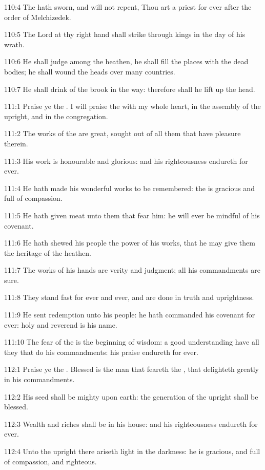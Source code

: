 110:4 The \LORD hath sworn, and will not repent, Thou art a priest for ever after the order of Melchizedek.

110:5 The Lord at thy right hand shall strike through kings in the day of his wrath.

110:6 He shall judge among the heathen, he shall fill the places with the dead bodies; he shall wound the heads over many countries.

110:7 He shall drink of the brook in the way: therefore shall he lift up the head.



111:1 Praise ye the \LORD. I will praise the \LORD with my whole heart, in the assembly of the upright, and in the congregation.

111:2 The works of the \LORD are great, sought out of all them that have pleasure therein.

111:3 His work is honourable and glorious: and his righteousness endureth for ever.

111:4 He hath made his wonderful works to be remembered: the \LORD is gracious and full of compassion.

111:5 He hath given meat unto them that fear him: he will ever be mindful of his covenant.

111:6 He hath shewed his people the power of his works, that he may give them the heritage of the heathen.

111:7 The works of his hands are verity and judgment; all his commandments are sure.

111:8 They stand fast for ever and ever, and are done in truth and uprightness.

111:9 He sent redemption unto his people: he hath commanded his covenant for ever: holy and reverend is his name.

111:10 The fear of the \LORD is the beginning of wisdom: a good understanding have all they that do his commandments: his praise endureth for ever.



112:1 Praise ye the \LORD. Blessed is the man that feareth the \LORD, that delighteth greatly in his commandments.

112:2 His seed shall be mighty upon earth: the generation of the upright shall be blessed.

112:3 Wealth and riches shall be in his house: and his righteousness endureth for ever.

112:4 Unto the upright there ariseth light in the darkness: he is gracious, and full of compassion, and righteous.

